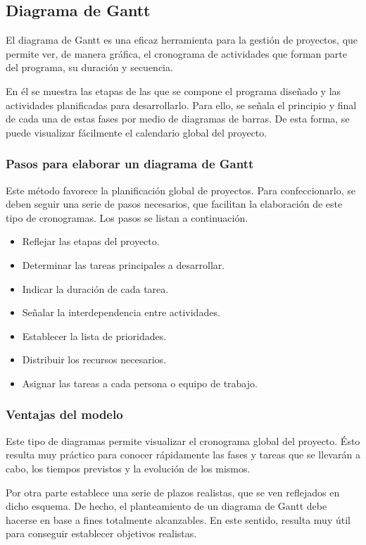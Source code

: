 \subsection{Diagrama de Gantt}
El diagrama de Gantt es una eficaz herramienta para la gestión de proyectos, que permite ver, de manera gráfica, el cronograma de actividades que forman parte del programa, su duración y secuencia.

En él se muestra las etapas de las que se compone el programa diseñado y las actividades planificadas para desarrollarlo. Para ello, se señala el principio y final de cada una de estas fases por medio de diagramas de barras. De esta forma, se puede visualizar  fácilmente  el calendario global del proyecto.

\subsubsection{Pasos para elaborar un diagrama de Gantt}
Este método favorece la planificación global de proyectos. Para confeccionarlo, se deben seguir una serie de pasos necesarios, que facilitan la elaboración de este tipo de cronogramas. Los pasos se listan a continuación.

\begin{itemize}
	\item Reflejar las etapas del proyecto.
	\item Determinar las tareas principales a desarrollar.
	\item Indicar la duración de cada tarea.
	\item Señalar la interdependencia entre actividades.
	\item Establecer la lista de prioridades.
	\item Distribuir los recursos necesarios.
	\item Asignar las tareas a cada persona o equipo de trabajo.
\end{itemize}

\subsubsection{Ventajas del modelo}
Este tipo de diagramas permite visualizar el cronograma global del proyecto. 
Ésto resulta muy práctico para conocer rápidamente las fases y tareas que se llevarán a cabo, los tiempos previstos y la evolución de los mismos.

Por otra parte establece una serie de plazos realistas, que se ven reflejados en dicho esquema.
De hecho, el planteamiento de un diagrama de Gantt debe hacerse en base a fines totalmente alcanzables.
En este sentido, resulta muy útil para conseguir establecer objetivos realistas.

